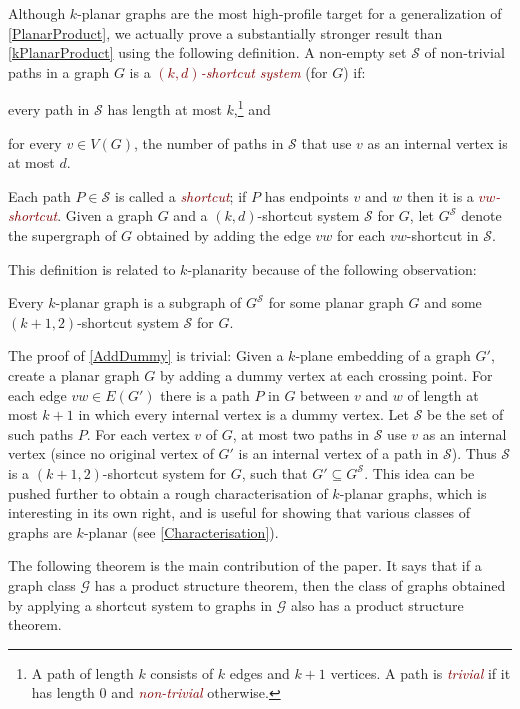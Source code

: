 \documentclass{patmorin}
\newcommand{\defin}[1]{\textcolor{Maroon}{\emph{#1}}}
\renewcommand{\SS}{\mathcal{S}}
\begin{document}
Although $k$-planar graphs are the most high-profile target for a generalization of \cref{PlanarProduct}, we actually prove a substantially stronger result than \cref{kPlanarProduct} using the following definition. A non-empty set $\SS$ of non-trivial paths in a graph $G$ is a \defin{$(k,d)$-shortcut system} (for $G$) if:

\begin{compactitem}
\item every path in $\SS$ has length at most $k$,\footnote{A path of length $k$ consists of $k$ edges and $k+1$ vertices.  A path is \defin{trivial} if it has length 0 and \defin{non-trivial} otherwise.} and
\item for every $v\in V(G)$, the number of paths in $\SS$ that use $v$ as an internal vertex is at most $d$.
\end{compactitem}
Each path $P\in\SS$ is called a \defin{shortcut}; if $P$ has endpoints $v$ and $w$ then it is a \defin{$vw$-shortcut}. Given a graph $G$ and a $(k,d)$-shortcut system $\SS$ for $G$, let $G^{\SS}$ denote the supergraph of $G$ obtained by adding the edge $vw$ for each $vw$-shortcut in $\SS$.

This definition is related to $k$-planarity because of the following observation:

\begin{obs}
\label{AddDummy}
Every $k$-planar graph is a subgraph of $G^\SS$ for some planar graph $G$ and some $(k+1,2)$-shortcut system $\SS$ for $G$.
\end{obs}

The proof of \cref{AddDummy} is trivial: Given a $k$-plane embedding of a graph $G'$, create a planar graph $G$ by adding a dummy vertex at each crossing point. For each edge $vw\in E(G')$ there is a path $P$ in $G$ between $v$ and $w$ of length at most $k+1$ in which every internal vertex is a dummy vertex. Let $\SS$ be the set of such paths $P$. For each vertex $v$ of $G$, at most two paths in $\SS$ use $v$ as an internal vertex (since no original vertex of $G'$ is an internal vertex of a path in $\SS$). Thus $\SS$ is a $(k+1,2)$-shortcut system for $G$, such that $G'\subseteq G^\SS$. This idea can be pushed further to obtain a rough characterisation of $k$-planar graphs, which is interesting in its own right, and is useful for showing that various classes of graphs are $k$-planar (see \cref{Characterisation}).


The following theorem is the main contribution of the paper. It says that if a graph class $\mathcal{G}$ has a product structure theorem, then the class of graphs obtained by applying a shortcut system to graphs in $\mathcal{G}$ also has a product structure theorem.
\end{document}

